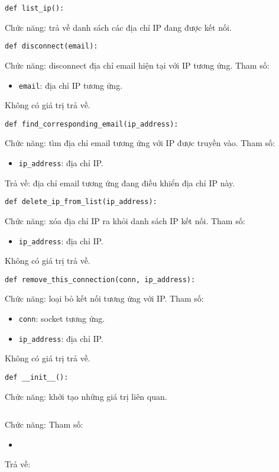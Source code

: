 \begin{lstlisting}
def list_ip():
\end{lstlisting}
Chức năng: trả về danh sách các địa chỉ IP đang được kết nối.

\begin{lstlisting}
def disconnect(email):
\end{lstlisting}
Chức năng: disconnect địa chỉ email hiện tại với IP tương ứng.
Tham số:
\begin{itemize}
\item \lstinline{email}: địa chỉ IP tương ứng.
\end{itemize}
Không có giá trị trả về.

\begin{lstlisting}
def find_corresponding_email(ip_address):
\end{lstlisting}
Chức năng: tìm địa chỉ email tương ứng với IP được truyền vào.
Tham số:
\begin{itemize}
\item \lstinline{ip_address}: địa chỉ IP.
\end{itemize}
Trả về: địa chỉ email tương ứng đang điều khiển địa chỉ IP này.

\begin{lstlisting}
def delete_ip_from_list(ip_address):
\end{lstlisting}
Chức năng: xóa địa chỉ IP ra khỏi danh sách IP kết nối.
Tham số: 
\begin{itemize}
\item \lstinline{ip_address}: địa chỉ IP.
\end{itemize}
Không có giá trị trả về.

\begin{lstlisting}
def remove_this_connection(conn, ip_address):
\end{lstlisting}
Chức năng: loại bỏ kết nối tương ứng với IP.
Tham số:
\begin{itemize}
\item \lstinline{conn}: socket tương ứng.
\item \lstinline{ip_address}: địa chỉ IP.
\end{itemize}
Không có giá trị trả về.

\begin{lstlisting}
def __init__():
\end{lstlisting}
Chức năng: khởi tạo những giá trị liên quan.



\begin{lstlisting}

\end{lstlisting}
Chức năng:
Tham số:
\begin{itemize}
\item \lstinline{}
\end{itemize}
Trả về: 

\lstinline{}